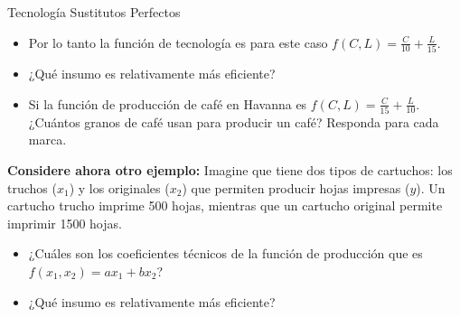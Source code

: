 \documentclass{beamer}
\theoremstyle{definition}
\begin{document}
\begin{frame}{Tecnolog\'ia Sustitutos Perfectos}
	\begin{itemize}
\item Por lo tanto la función de tecnología es para este caso $f(C,L)=\frac{C}{10}+\frac{L}{15}$.

\item ¿Qué insumo es relativamente más eficiente?

\item Si la función de producción de café en Havanna es $f(C,L)=\frac{C}{15}+\frac{L}{10}$. ¿Cuántos granos de café usan para producir un café? Responda para cada marca.
	\end{itemize}

\textbf{Considere ahora otro ejemplo:} Imagine que tiene dos tipos de cartuchos: los truchos ($x_1$) y los originales ($x_2$) que permiten producir hojas impresas ($y$). Un cartucho trucho imprime 500 hojas, mientras que un cartucho original permite imprimir 1500 hojas.
	\begin{itemize}
 \item ¿Cuáles son los coeficientes técnicos de la función de producción que es $f(x_1,x_2)=ax_1+bx_2$?
 \item ¿Qué insumo es relativamente más eficiente?
	\end{itemize}

 
\end{frame}
\end{document}
